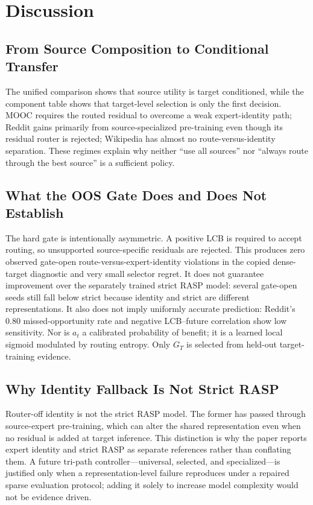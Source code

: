 \documentclass[journal]{IEEEtran}
\begin{document}
\section{Discussion}
\subsection{From Source Composition to Conditional Transfer}
The unified comparison shows that source utility is target conditioned, while the component table shows that target-level selection is only the first decision. MOOC requires the routed residual to overcome a weak expert-identity path; Reddit gains primarily from source-specialized pre-training even though its residual router is rejected; Wikipedia has almost no route-versus-identity separation. These regimes explain why neither ``use all sources'' nor ``always route through the best source'' is a sufficient policy.

\subsection{What the OOS Gate Does and Does Not Establish}
The hard gate is intentionally asymmetric. A positive LCB is required to accept routing, so unsupported source-specific residuals are rejected. This produces zero observed gate-open route-versus-expert-identity violations in the copied dense-target diagnostic and very small selector regret. It does not guarantee improvement over the separately trained strict RASP model: several gate-open seeds still fall below strict because identity and strict are different representations. It also does not imply uniformly accurate prediction: Reddit's 0.80 missed-opportunity rate and negative LCB--future correlation show low sensitivity. Nor is $a_t$ a calibrated probability of benefit; it is a learned local sigmoid modulated by routing entropy. Only $G_T$ is selected from held-out target-training evidence.

\subsection{Why Identity Fallback Is Not Strict RASP}
Router-off identity is not the strict RASP model. The former has passed through source-expert pre-training, which can alter the shared representation even when no residual is added at target inference. This distinction is why the paper reports expert identity and strict RASP as separate references rather than conflating them. A future tri-path controller---universal, selected, and specialized---is justified only when a representation-level failure reproduces under a repaired sparse evaluation protocol; adding it solely to increase model complexity would not be evidence driven.
\end{document}

